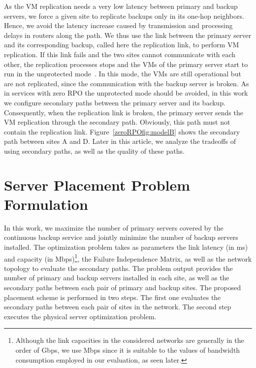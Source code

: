 \documentclass[preprint]{elsarticle}
\begin{document}
As the VM replication needs a very low latency between primary and backup servers, we force a given site to replicate backups only in its one-hop neighbors. Hence, we avoid the latency increase caused by transmission and processing delays in routers along the path. We thus use the link between the primary server and its corresponding backup, called here the replication link, to perform VM replication. If this link fails and the two sites cannot communicate with each other, the replication processes stops and the VMs of the primary server start to run in the unprotected mode~\cite{rajagopalan2012secondsite}.
In this mode, the VMs are still operational but are not replicated, since the communication with the backup server is broken.
As in services with zero RPO the unprotected mode should be avoided, in this work we configure secondary paths between the primary server and its backup. Consequently, when the replication link is broken, the primary server sends the VM replication through the secondary path. Obviously, this path must not contain the replication link.
Figure~\ref{zeroRPOfig:modelB} shows the secondary path between sites A and D. Later in this article, we analyze the tradeoffs of using secondary paths, as well as the quality of these paths.

\section{Server Placement Problem Formulation}
\label{zeroRPOsec:problem}

In this work, we maximize the number of primary servers covered by the continuous backup service and jointly minimize the number of backup servers installed. The optimization problem takes as parameters the link latency (in ms) and capacity (in Mbps)\footnote{Although the link capacities in the considered networks are generally in the order of Gbps, we use Mbps since it is suitable to the values of bandwidth consumption employed in our evaluation, as seen later.}, the Failure Independence Matrix, as well as the network topology to evaluate the secondary paths. The problem output provides the number of primary and backup servers installed in each site, as well as the secondary paths between each pair of primary and backup sites. The proposed placement scheme is performed in two steps. The first one evaluates the secondary paths between each pair of sites in the network. The second step executes the physical server optimization problem.
\end{document}
